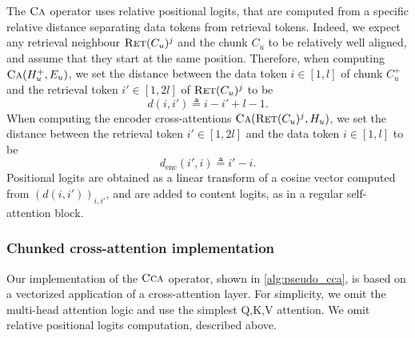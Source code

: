 \documentclass[11pt, a4paper, logo]{deepmind}
\newcommand{\ccca}{\textsc{Cca}}
\newcommand{\crossattention}{\textsc{Ca}}
\newcommand{\ret}{\textsc{Ret}}
\begin{document}
The $\crossattention$ operator uses relative positional logits, that are computed from a specific relative distance separating data tokens from retrieval tokens. Indeed, we expect any retrieval neighbour $\ret(C_u)^j$ and the chunk $C_u$ to be relatively well aligned, and assume that they start at the same position. Therefore, when computing $\crossattention(H_u^+, E_u)$, we set the distance between the data token $i \in [1, l]$ of chunk $C_u^+$ and the retrieval token $i' \in [1, 2 l]$ of $\ret(C_u)^j$ to be 
\begin{equation}
    d(i, i') \triangleq i - i' + l - 1.
\end{equation}
When computing the encoder cross-attentions $\crossattention(\ret(C_u)^j, H_u)$, we set the distance between the retrieval token $i' \in [1, 2 l]$ and the data token $i \in [1, l]$ to be 
\begin{equation}
    d_{\textrm{enc}}(i', i) \triangleq i' - i.
\end{equation}
Positional logits are obtained as a linear transform of a cosine vector computed from $(d(i, i'))_{i, i'}$, and are added to content logits, as in a regular self-attention block.

\subsubsection{Chunked cross-attention implementation}\label{app:ccca}

Our implementation of the $\ccca$ operator, shown in \autoref{alg:pseudo_cca}, is based on a vectorized application of a cross-attention layer.
For simplicity, we omit the multi-head attention logic and use the simplest Q,K,V attention. 
We omit relative positional logits computation, described above.
\end{document}
